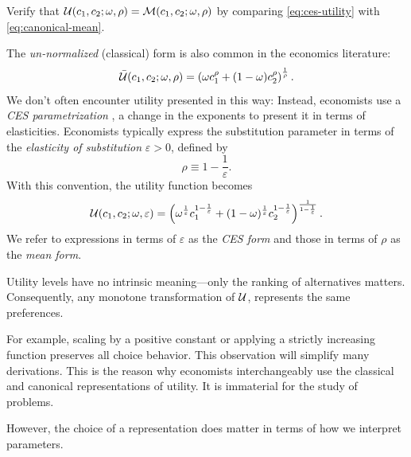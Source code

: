 \begin{callouttip}[Exercise]
Verify that $\mathcal{U}(c_1, c_2; \omega, \rho) = \mathcal{M}(c_1, c_2; \omega, \rho)$ by comparing \cref{eq:ces-utility} with \cref{eq:canonical-mean}.
\end{callouttip}
The \emph{un-normalized} (classical) form is also common in the economics literature:
\begin{equation}
\label{eq:ces-utility-classical}
\bar{\mathcal{U}}(c_1, c_2; \omega, \rho) = \left( \omega c_1^\rho + (1-\omega) c_2^\rho \right)^{\frac{1}{\rho}}.
\end{equation}
We don't often encounter utility presented in this way: Instead, economists use a \textit{CES parametrization }, a change in the exponents to present it in terms of elasticities.  Economists typically express the substitution parameter in terms of the \emph{elasticity of substitution} $\varepsilon > 0$, defined by
\begin{equation}
\label{eq:rho-epsilon}
\rho \equiv 1 - \frac{1}{\varepsilon}.
\end{equation}
With this convention, the utility function becomes
\begin{equation}
\label{eq:ces-epsilon-form}
\mathcal{U}(c_1, c_2; \omega, \varepsilon) = \left( \omega^{\frac{1}{\varepsilon}} c_1^{1-\frac{1}{\varepsilon}} + (1-\omega)^{\frac{1}{\varepsilon}} c_2^{1-\frac{1}{\varepsilon}} \right)^{\frac{1}{1-\frac{1}{\varepsilon}}}.
\end{equation}
We refer to expressions in terms of $\varepsilon$ as the \emph{CES form} and those in terms of $\rho$ as the \emph{mean form}.

\begin{calloutnote}
\begin{remark}
\label{rem:ordinal}
Utility levels have no intrinsic meaning---only the ranking of alternatives matters. Consequently, any monotone transformation of $\mathcal{U}$,  represents the same preferences. 
\end{remark}
For example, scaling by a positive constant or applying a strictly increasing function preserves all choice behavior. This observation will simplify many derivations. This is the reason why economists interchangeably use the classical and canonical representations of utility. It is immaterial for the study of problems. 

However, the choice of a representation does matter in terms of how we interpret parameters.
\end{calloutnote}

